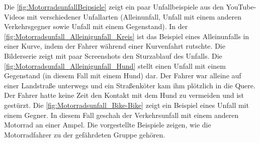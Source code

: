 Die \autoref{fig:MotorradsunfallBeipsiele} zeigt ein paar Unfallbeispiele aus den YouTube-Videos mit verschiedener Unfallarten (Alleinunfall, Unfall mit einem anderen Verkehrsgegner sowie Unfall mit einem Gegenstand). In der \autoref{fig:Motorradsunfall_Alleinigunfall_Kreis} ist das Beispiel eines Alleinunfalls in einer Kurve, indem der Fahrer während einer Kurvenfahrt rutschte. Die Bilderserie zeigt mit paar Screenshots den Sturzablauf des Unfalls. Die \autoref{fig:Motorradsunfall_Alleinigunfall_Hund} stellt einen Unfall mit einem Gegenstand (in diesem Fall mit einem Hund) dar. Der Fahrer war alleine auf einer Landstraße unterwegs und ein Straßenköter kam ihm plötzlich in die Quere. Der Fahrer hatte keine Zeit den Kontakt mit dem Hund zu vermeiden und ist gestürzt.
Die \autoref{fig:Motorradsunfall_Bike-Bike} zeigt ein Beispiel eines Unfall mit einem Gegner. In diesem Fall geschah der Verkehrsunfall mit einem anderen Motorrad an einer Ampel. Die vorgestellte Beispiele zeigen, wie die Motorradfahrer zu der gefährdeten Gruppe gehören.
